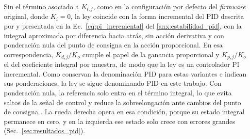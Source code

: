 Sin el término asociado a $K_{i,j}$, como en la configuración por defecto del
\textit{firmware} original, donde $K_i=0$, la ley coincide con la forma
incremental del PID descrita por \citet[Sec.~13.4]{astrom2009controlpid} y
presentada en la Ec.~\eqref{eq:pi_incremental} del \ref{anx:estabilidad_pid},
con la integral aproximada por
diferencia hacia atrás, sin acción derivativa y con ponderación nula del punto
de consigna en la acción proporcional. En esa correspondencia, $K_{d,j}/K_o$
cumple el papel de la ganancia proporcional y $K_{p,j}/K_o$ el del coeficiente
integral por muestra, de modo que la ley es un controlador PI incremental. Como \citet[Sec.~3.4]{astrom2009controlpid} conservan la
denominación PID para estas variantes e indican sus ponderaciones, la ley se
sigue denominando PID en este trabajo. Con ponderación nula, la referencia solo
entra en el término integral, lo que evita saltos de la señal de control y
reduce la sobreelongación ante cambios del punto de consigna
\citep[Sec.~3.4]{astrom2009controlpid}. La rueda derecha opera en esa
condición, porque su estado integral permanece en cero, y en la izquierda ese
estado solo crece con errores grandes (Sec.~\ref{sec:resultados_pid}).

